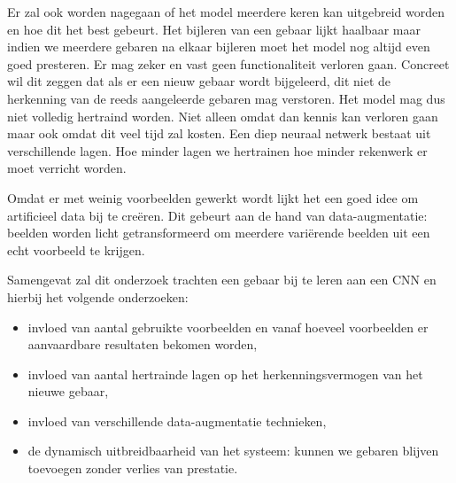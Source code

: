 \npar Er zal ook worden nagegaan of het model meerdere keren kan uitgebreid worden en hoe dit het best gebeurt. Het bijleren van een gebaar lijkt haalbaar maar indien we meerdere gebaren na elkaar bijleren moet het model nog altijd even goed presteren. Er mag zeker en vast geen functionaliteit verloren gaan. Concreet wil dit zeggen dat als er een nieuw gebaar wordt bijgeleerd, dit niet de herkenning van de reeds aangeleerde gebaren mag verstoren. Het model mag dus niet volledig hertraind worden. Niet alleen omdat dan kennis kan verloren gaan maar ook omdat dit veel tijd zal kosten. Een diep neuraal netwerk bestaat uit verschillende lagen. Hoe minder lagen we hertrainen hoe minder rekenwerk er moet verricht worden.

\npar Omdat er met weinig voorbeelden gewerkt wordt lijkt het een goed idee om artificieel data bij te cre\"eren. Dit gebeurt aan de hand van data-augmentatie: beelden worden licht getransformeerd om meerdere vari\"erende beelden uit een echt voorbeeld te krijgen.

\npar Samengevat zal dit onderzoek trachten een gebaar bij te leren aan een CNN en hierbij het volgende onderzoeken:
\begin{itemize}
	\item invloed van aantal gebruikte voorbeelden en vanaf hoeveel voorbeelden er aanvaardbare resultaten bekomen worden,
	\item invloed van aantal hertrainde lagen op het herkenningsvermogen van het nieuwe gebaar,
	\item invloed van verschillende data-augmentatie technieken,
	\item de dynamisch uitbreidbaarheid van het systeem: kunnen we gebaren blijven toevoegen zonder verlies van prestatie.
\end{itemize}






 